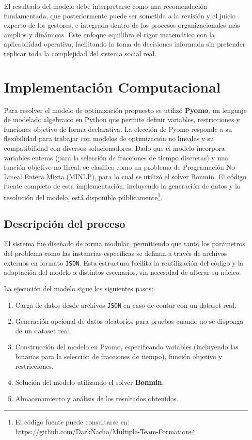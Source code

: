 \documentclass[conference]{IEEEtran}
\begin{document}
El resultado del modelo debe interpretarse como una recomendación fundamentada, que posteriormente puede ser sometida a la revisión y el juicio experto de los gestores, e integrada dentro de los procesos organizacionales más amplios y dinámicos. Este enfoque equilibra el rigor matemático con la aplicabilidad operativa, facilitando la toma de decisiones informada sin pretender replicar toda la complejidad del sistema social real.


\section{Implementación Computacional}

Para resolver el modelo de optimización propuesto se utilizó \textbf{Pyomo}\cite{pyomo_hart2011}, un lenguaje de modelado algebraico en Python que permite definir variables, restricciones y funciones objetivo de forma declarativa. La elección de Pyomo responde a su flexibilidad para trabajar con modelos de optimización no lineales y su compatibilidad con diversos solucionadores. Dado que el modelo incorpora variables enteras (para la selección de fracciones de tiempo discretas) y una función objetivo no lineal, se clasifica como un problema de Programación No Lineal Entera Mixta (MINLP), para lo cual se utilizó el solver Bonmin\cite{bonmin_bonami2008}. El código fuente completo de esta implementación, incluyendo la generación de datos y la resolución del modelo, está disponible públicamente\footnote{El código fuente puede consultarse en: https://github.com/DarkNacho/Multiple-Team-Formation}.

\subsection{Descripción del proceso}

El sistema fue diseñado de forma modular, permitiendo que tanto los parámetros del problema como las instancias específicas se definan a través de archivos externos en formato \texttt{JSON}. Esta estructura facilita la reutilización del código y la adaptación del modelo a distintos escenarios, sin necesidad de alterar su núcleo.

La ejecución del modelo sigue los siguientes pasos:
\begin{enumerate}
    \item Carga de datos desde archivos \texttt{JSON} en caso de contar con un dataset real.
    \item Generación opcional de datos aleatorios para pruebas cuando no se disponga de un dataset real.
    \item Construcción del modelo en Pyomo, especificando variables (incluyendo las binarias para la selección de fracciones de tiempo), función objetivo y restricciones.
    \item Solución del modelo utilizando el solver \textbf{Bonmin}.
    \item Almacenamiento y análisis de los resultados obtenidos.
\end{enumerate}
\end{document}
